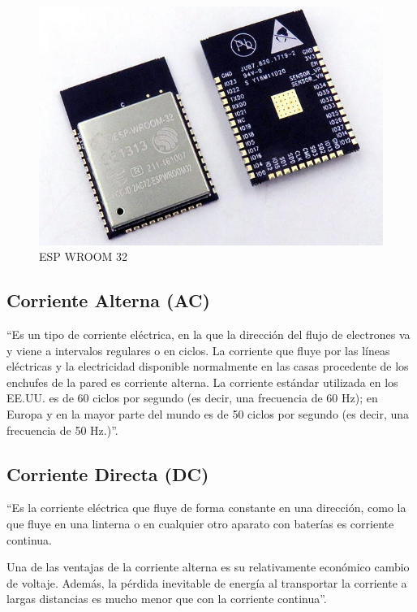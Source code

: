 \begin{figure}
	\centering
	\caption{ESP WROOM 32\cite{ESPIMG}}
	\label{fig:esp32-wroom-s32-00}
	\includegraphics{Imagenes/esp32-wroom-s32-00}
\end{figure}

\subsection{Corriente Alterna (AC)}

``Es un tipo de corriente eléctrica, en la que la dirección del flujo de electrones va y viene a intervalos regulares o en ciclos. La corriente que fluye por las líneas eléctricas y la electricidad disponible normalmente en las casas procedente de los enchufes de la pared es corriente alterna. La corriente estándar utilizada en los EE.UU. es de 60 ciclos por segundo (es decir, una frecuencia de 60 Hz); en Europa y en la mayor parte del mundo es de 50 ciclos por segundo (es decir, una frecuencia de 50 Hz.)''. \cite{Cor}

\subsection{Corriente Directa (DC)}

``Es la corriente eléctrica que fluye de forma constante en una dirección, como la que fluye en una linterna o en cualquier otro aparato con baterías es corriente continua.

Una de las ventajas de la corriente alterna es su relativamente económico cambio de voltaje. Además, la pérdida inevitable de energía al transportar la corriente a largas distancias es mucho menor que con la corriente continua''. \cite{Cor}

